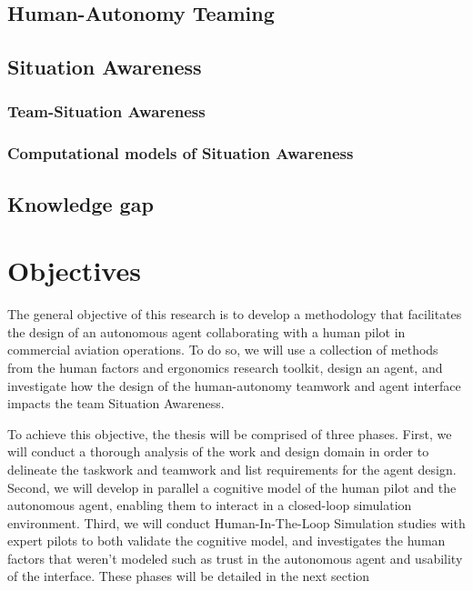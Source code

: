 \documentclass[12pt,a4paper]{article} %
\begin{document}
	\subsection{Human-Autonomy Teaming}
	\subsection{Situation Awareness}
	\subsubsection{Team-Situation Awareness}
	\subsubsection{Computational models of Situation Awareness}
	\subsection{Knowledge gap} %
	
	
	\section{Objectives} %
	The general objective of this research is to develop a methodology that facilitates the design of an autonomous agent collaborating with a human pilot in commercial aviation operations. To do so, we will use a collection of methods from the human factors and ergonomics research toolkit, design an agent, and investigate how the design of the human-autonomy teamwork and agent interface impacts the team Situation Awareness.
	
	To achieve this objective, the thesis will be comprised of three phases. First, we will conduct a thorough analysis of the work and design domain in order to delineate the taskwork and teamwork and list requirements for the agent design. Second, we will develop in parallel a cognitive model of the human pilot and the autonomous agent, enabling them to interact in a closed-loop simulation environment. Third, we will conduct Human-In-The-Loop Simulation studies with expert pilots to both validate the cognitive model, and investigates the human factors that weren't modeled such as trust in the autonomous agent and usability of the interface. These phases will be detailed in the next section 
	
\end{document}
